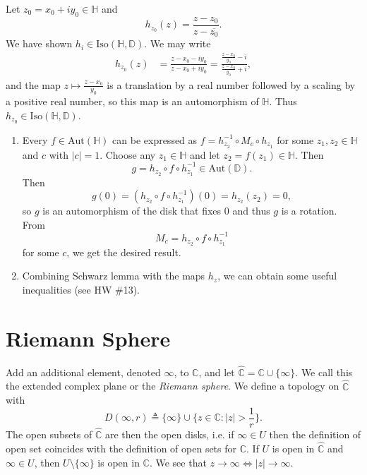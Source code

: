 Let $z_0 = x_0 + i y_0 \in \mathbb{H}$ and
$$
  h_{z_0}(z)
= \frac{z - z_0}{z - \overline{z_0}}.
$$
We have shown $h_i \in \mathrm{Iso}(\mathbb{H}, \mathbb{D})$.
We may write
\begin{align*}
   h_{z_0}(z)
&= \frac{z - x_0 - i y_0}
        {z - x_0 + i y_0}
 = \frac{\frac{z - x_0}{y_0} - i}
        {\frac{z - x_0}{y_0} + i},
\end{align*}
and the map $z \mapsto \frac{z - x_0}{y_0}$ is a translation by
a real number followed by a scaling by a positive real number, so
this map is an automorphism of $\mathbb{H}$. Thus
$h_{z_0} \in \mathrm{Iso}(\mathbb{H}, \mathbb{D})$.

\begin{remark}
  \begin{enumerate}
    \item{
      Every $f \in \mathrm{Aut}(\mathbb{H})$ can be expressed as
      $f = h_{z_2}^{-1} \circ M_c \circ h_{z_1}$ for some
      $z_1, z_2 \in \mathbb{H}$ and $c$ with $|c| = 1$.
      Choose any $z_1 \in \mathbb{H}$ and let
      $z_2 = f(z_1) \in \mathbb{H}$. Then
      $$
          g = h_{z_2} \circ f \circ h_{z_1}^{-1}
      \in \mathrm{Aut}(\mathbb{D}).
      $$
      Then
      $$
        g(0)
      = (h_{z_2} \circ f \circ h_{z_1}^{-1})(0)
      = h_{z_2} (z_2) = 0,
      $$
      so $g$ is an automorphism of the disk that fixes 0 and thus
      $g$ is a rotation. From
      $$
      M_c = h_{z_2} \circ f \circ h_{z_1}^{-1}
      $$
      for some $c$, we get the desired result.
    }
    \item{
      Combining Schwarz lemma with the maps $h_z$, we can obtain some
      useful inequalities (see HW \#13).
    }
  \end{enumerate}
\end{remark}

\section{Riemann Sphere}
\begin{defn}
Add an additional element, denoted $\infty$, to $\mathbb{C}$, and let
$\hat{\mathbb{C}} = \mathbb{C} \cup \{ \infty \}$. We call this the
extended complex plane or the \emph{Riemann sphere}. We define a
topology on $\hat{\mathbb{C}}$ with
$$
           D(\infty, r)
\triangleq \{ \infty \} \cup \{z \in \mathbb{C} : |z| > \frac{1}{r} \}.
$$
The open subsets of $\hat{\mathbb{C}}$ are then the open disks, i.e.
if $\infty \in U$ then the definition of open set coincides with the
definition of open sets for $\mathbb{C}$. If $U$ is open in
$\hat{\mathbb{C}}$ and $\infty \in U$, then $U \setminus \{ \infty \}$
is open in $\mathbb{C}$. We see that $z \to \infty \iff |z| \to
\infty$.
\end{defn}

